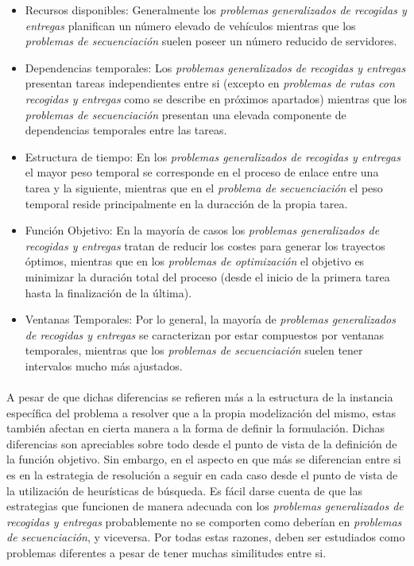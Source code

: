 \documentclass{subfiles}
\begin{document}
          \begin{itemize}

            \item Recursos disponibles: Generalmente los \emph{problemas generalizados de recogidas y entregas} planifican un número elevado de vehículos mientras que los \emph{problemas de secuenciación} suelen poseer un número reducido de servidores.

            \item Dependencias temporales: Los \emph{problemas generalizados de recogidas y entregas} presentan tareas independientes entre si (excepto en \emph{problemas de rutas con recogidas y entregas} como se describe en próximos apartados) mientras que los \emph{problemas de secuenciación} presentan una elevada componente de dependencias temporales entre las tareas.

            \item Estructura de tiempo: En los \emph{problemas generalizados de recogidas y entregas} el mayor peso temporal se corresponde en el proceso de enlace entre una tarea y la siguiente, mientras que en el \emph{problema de secuenciación} el peso temporal reside principalmente en la duracción de la propia tarea.

            \item Función Objetivo: En la mayoría de casos los \emph{problemas generalizados de recogidas y entregas} tratan de reducir los costes para generar los trayectos óptimos, mientras que en los \emph{problemas de optimización} el objetivo es minimizar la duración total del proceso (desde el inicio de la primera tarea hasta la finalización de la última).

            \item Ventanas Temporales: Por lo general, la mayoría de \emph{problemas generalizados de recogidas y entregas} se caracterizan por estar compuestos por  ventanas temporales, mientras que los \emph{problemas de secuenciación} suelen tener intervalos mucho más ajustados.

          \end{itemize}

          \paragraph{}
          A pesar de que dichas diferencias se refieren más a la estructura de la instancia específica del problema a resolver que a la propia modelización del mismo, estas también afectan en cierta manera a la forma de definir la formulación. Dichas diferencias son apreciables sobre todo desde el punto de vista de la definición de la función objetivo. Sin embargo, en el aspecto en que más se diferencian entre si es en la estrategia de resolución a seguir en cada caso desde el punto de vista de la utilización de heurísticas de búsqueda. Es fácil darse cuenta de que las estrategias que funcionen de manera adecuada con los \emph{problemas generalizados de recogidas y entregas} probablemente no se comporten como deberían en \emph{problemas de secuenciación}, y viceversa. Por todas estas razones, deben ser estudiados como problemas diferentes a pesar de tener muchas similitudes entre si.
\end{document}
